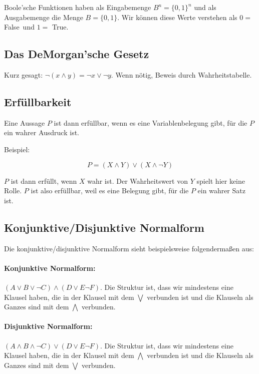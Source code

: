 \documentclass{scrartcl}
\begin{document}
Boole'sche Funktionen haben als Eingabemenge $B^n = \{0, 1\}^n$ und als Ausgabemenge die Menge
$B = \{0, 1\}$. Wir können diese Werte verstehen als \frq $0 = $ False\flq\ und \frq $1 = $ True\flq.

\subsection{Das DeMorgan'sche Gesetz}

\label{DeMorgan}

Kurz gesagt: $\lnot(x \wedge y) = \lnot x \lor \lnot y$. Wenn nötig, Beweis durch Wahrheitstabelle.

\subsection{Erfüllbarkeit}

Eine Aussage $P$ ist dann erfüllbar, wenn es eine Variablenbelegung gibt, für die $P$ ein wahrer Ausdruck ist.

Beispiel:

\begin{equation}
	P = (X \wedge Y) \lor (X \wedge \lnot Y)
\end{equation}

$P$ ist dann erfüllt, wenn $X$ wahr ist. Der Wahrheitswert von $Y$ spielt hier keine Rolle. $P$ ist also erfüllbar, weil
es eine Belegung gibt, für die $P$ ein wahrer Satz ist.

\subsection{Konjunktive/Disjunktive Normalform}

\label{knfdnf}

Die konjunktive/disjunktive Normalform sieht beispielsweise folgendermaßen aus:

\paragraph{Konjunktive Normalform:} $(A \lor B \lor \lnot C) \wedge (D \lor E \lnot F)$. Die Struktur ist, dass wir mindestens eine
Klausel haben, die in der Klausel mit dem $\bigvee$ verbunden ist und die Klauseln als Ganzes sind mit dem $\bigwedge$ verbunden.

\paragraph{Disjunktive Normalform:} $(A \wedge B \wedge \lnot C) \lor (D \lor E \lnot F)$. Die Struktur ist, dass wir mindestens eine
Klausel haben, die in der Klausel mit dem $\bigwedge$ verbunden ist und die Klauseln als Ganzes sind mit dem $\bigvee$ verbunden.
\end{document}
